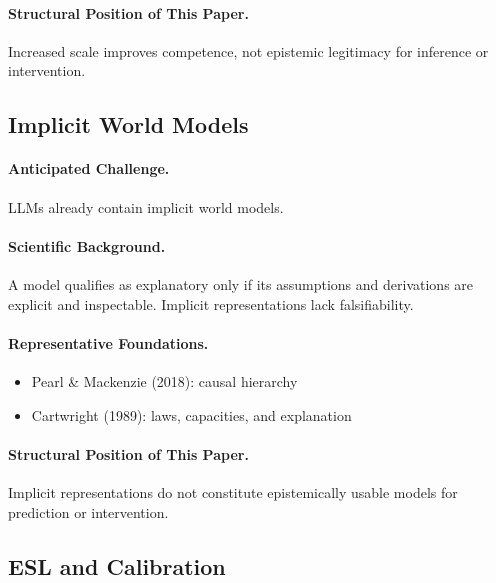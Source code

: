 \paragraph{Structural Position of This Paper.}
Increased scale improves competence, not epistemic legitimacy for inference or intervention.


\subsection{Implicit World Models}

\paragraph{Anticipated Challenge.}
LLMs already contain implicit world models.

\paragraph{Scientific Background.}
A model qualifies as explanatory only if its assumptions and derivations are explicit and inspectable. Implicit representations lack falsifiability.

\paragraph{Representative Foundations.}
\begin{itemize}
    \item Pearl \& Mackenzie (2018): causal hierarchy
    \item Cartwright (1989): laws, capacities, and explanation
\end{itemize}

\paragraph{Structural Position of This Paper.}
Implicit representations do not constitute epistemically usable models for prediction or intervention.


\subsection{ESL and Calibration}

